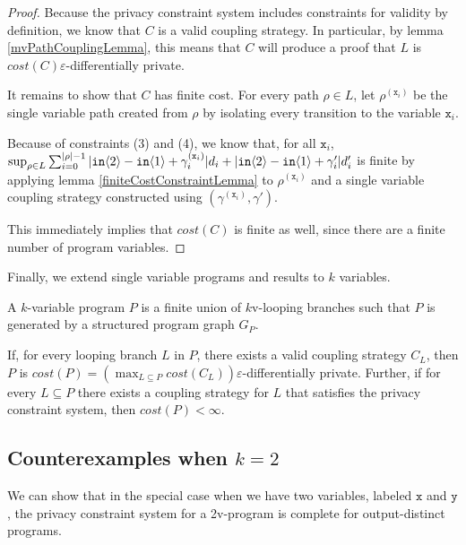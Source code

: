 \begin{proof}
    Because the privacy constraint system includes constraints for validity by definition, we know that $C$ is a valid coupling strategy. In particular, by lemma \ref{mvPathCouplingLemma}, this means that $C$ will produce a proof that $L$ is $cost(C)\varepsilon$-differentially private. 
    
    It remains to show that $C$ has finite cost. For every path $\rho\in L$, let $\rho^{(\texttt{x}_i)}$ be the single variable path created from $\rho$ by isolating every transition to the variable $\texttt{x}_i$. 

    Because of constraints (3) and (4), we know that, for all $\texttt{x}_i$, $\sup_{\rho\in L}\sum_{i=0}^{|\rho|-1}|\texttt{in}\langle2 \rangle-\texttt{in}\langle1 \rangle+\gamma_i^{(\texttt{x}_i)}|d_i + |\texttt{in}\langle2 \rangle-\texttt{in}\langle1 \rangle+\gamma_i'|d_i'$ is finite by applying lemma \ref{finiteCostConstraintLemma} to $\rho^{(\texttt{x}_i)}$ and a single variable coupling strategy constructed using $(\gamma^{(\texttt{x}_i)}, \gamma')$. 

    This immediately implies that $cost(C)$ is finite as well, since there are a finite number of program variables. 
\end{proof}

Finally, we extend single variable programs and results to $k$ variables.

\begin{defn}
    A $k$-variable program $P$ is a finite union of $k$v-looping branches such that $P$ is generated by a structured program graph $G_P$.
\end{defn}

\begin{lemma}
    If, for every looping branch $L$ in $P$, there exists a valid coupling strategy $C_L$, then $P$ is $cost(P) = (\max_{L\subseteq P} cost(C_L))\varepsilon$-differentially private. Further, if for every $L\subseteq P$ there exists a coupling strategy for $L$ that satisfies the privacy constraint system, then $cost(P) <\infty$.
\end{lemma}

\subsection{Counterexamples when $k=2$}

We can show that in the special case when we have two variables, labeled $\texttt{x}$ and $\texttt{y}$, the privacy constraint system for a 2v-program is complete for output-distinct programs. 

